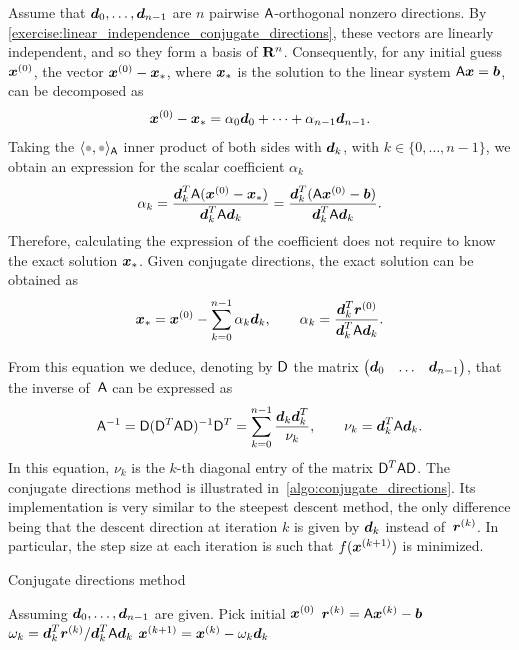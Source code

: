 Assume that $\mathbf{\boldsymbol{d}}_0, \dotsc, \mathbf{\boldsymbol{d}}_{n-1}$ are $n$ pairwise $\mathsf A$-orthogonal nonzero directions.
By \cref{exercise:linear_independence_conjugate_directions},
these vectors are linearly independent,
and so they form a basis of $\mathbf R^n$.
Consequently, for any initial guess $\mathbf{\boldsymbol{x}}^{(0)}$,
the vector $\mathbf{\boldsymbol{x}}^{(0)} - \mathbf{\boldsymbol{x}}_*$,
where $\mathbf{\boldsymbol{x}}_*$ is the solution to the linear system $\mathsf A \mathbf{\boldsymbol{x}} = \mathbf{\boldsymbol{b}}$,
can be decomposed as
\[
    \mathbf{\boldsymbol{x}}^{(0)} - \mathbf{\boldsymbol{x}}_* = \alpha_0 \mathbf{\boldsymbol{d}}_0 + \dotsb + \alpha_{n-1} \mathbf{\boldsymbol{d}}_{n-1}.
\]
Taking the $\ip{\placeholder, \placeholder}_{\mat A}$ inner product of both sides with $\mathbf{\boldsymbol{d}}_k$,
with $k \in \{0, \dotsc, n-1\}$,
we obtain an expression for the scalar coefficient $\alpha_k$
\[
    \alpha_k = \frac{\mathbf{\boldsymbol{d}}_k^T \mathsf A (\mathbf{\boldsymbol{x}}^{(0)} - \mathbf{\boldsymbol{x}}_*)}{\mathbf{\boldsymbol{d}}_k^T \mathsf A \mathbf{\boldsymbol{d}}_k}
    = \frac{\mathbf{\boldsymbol{d}}_k^T (\mathsf A \mathbf{\boldsymbol{x}}^{(0)} - \mathbf{\boldsymbol{b}})}{\mathbf{\boldsymbol{d}}_k^T \mathsf A \mathbf{\boldsymbol{d}}_k}.
\]
Therefore, calculating the expression of the coefficient does not require to know the exact solution $\mathbf{\boldsymbol{x}}_*$.
Given conjugate directions, the exact solution can be obtained as
\begin{equation}
    \label{eq:linear_expansion_conjugate_direction}
    \mathbf{\boldsymbol{x}}_* = \mathbf{\boldsymbol{x}}^{(0)} - \sum_{k=0}^{n-1} \alpha_k \mathbf{\boldsymbol{d}}_k, \qquad \alpha_k = \frac{\mathbf{\boldsymbol{d}}_k^T \mathbf{\boldsymbol{r}}^{(0)}}{\mathbf{\boldsymbol{d}}_k^T \mathsf A \mathbf{\boldsymbol{d}}_k}.
\end{equation}

From this equation we deduce,
denoting by $\mathsf D$ the matrix $\begin{pmatrix} \mathbf{\boldsymbol{d}}_0 & \hdots & \mathbf{\boldsymbol{d}}_{n-1} \end{pmatrix}$,
that the inverse of~$\mathsf A$ can be expressed as
\[
    \mathsf A^{-1} = \mathsf D (\mathsf D^T \mathsf A \mathsf D)^{-1} \mathsf D^T
    = \sum_{k=0}^{n-1} \frac{\mathbf{\boldsymbol{d}}_k \mathbf{\boldsymbol{d}}_k^T}{\nu_k}, \qquad \nu_k = \mathbf{\boldsymbol{d}}_k^T \mathsf A \mathbf{\boldsymbol{d}}_k.
\]
In this equation, $\nu_k$ is the $k$-th diagonal entry of the matrix $\mathsf D^T \mathsf A \mathsf D$.
The conjugate directions method is illustrated in~\cref{algo:conjugate_directions}.
Its implementation is very similar to the steepest descent method,
the only difference being that the descent direction at iteration $k$ is given by $\mathbf{\boldsymbol{d}}_k$ instead of~$\mathbf{\boldsymbol{r}}^{(k)}$.
In particular, the step size at each iteration is such that $f(\mathbf{\boldsymbol{x}}^{(k+1)})$ is minimized.
\begin{algorithm}
    \caption{Conjugate directions method}%
    \label{algo:conjugate_directions}%
    \begin{algorithmic}[1]
        \State Assuming $\mathbf{\boldsymbol{d}}_0, \dotsc, \mathbf{\boldsymbol{d}}_{n-1}$ are given.
        \State Pick initial $\mathbf{\boldsymbol{x}}^{(0)}$
            \State $\mathbf{\boldsymbol{r}}^{(k)} = \mathsf A \mathbf{\boldsymbol{x}}^{(k)} - \mathbf{\boldsymbol{b}}$
            \State $\omega_k = \mathbf{\boldsymbol{d}}_k^T \mathbf{\boldsymbol{r}}^{(k)}/\mathbf{\boldsymbol{d}}_k^T \mathsf A \mathbf{\boldsymbol{d}}_k$
            \State $\mathbf{\boldsymbol{x}}^{(k+1)} = \mathbf{\boldsymbol{x}}^{(k)} - \omega_k \mathbf{\boldsymbol{d}}_k$
        \EndFor
    \end{algorithmic}
\end{algorithm}

